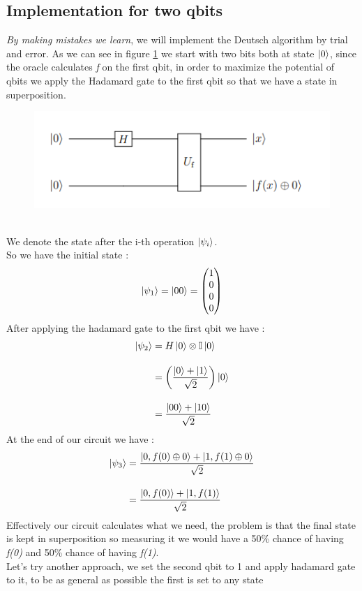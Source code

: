 \subsection{Implementation for two qbits}
\textit{By making mistakes we learn}, we will implement the Deutsch algorithm by trial and error.
As we can see in figure \ref{Deutsh2Bits} we start with two bits both at state $\ket{0}$, since the oracle calculates \textit{f} on the first qbit, in order to maximize the potential of qbits we apply the Hadamard gate to the first qbit so that we have a state in superposition. \\
\begin{figure}[h]
    \centering
    \includegraphics{QuantumAlgorithms/images/Deutsch2Bits.png}
    \caption{}
    \label{Deutsh2Bits}
\end{figure}
\\
We denote the state after the i-th operation $\ket{\psi_i}$. \\
So we have the initial state : 
\begin{align*}
    \ket{\psi_1} = \ket{00} = \begin{pmatrix}1 \\ 0 \\ 0 \\ 0\end{pmatrix}
\end{align*}
After applying the hadamard gate to the first qbit we have :
\begin{align*}
    \ket{\psi_2} &= H\ket{0} \otimes \mathbb{I}\ket{0} \\[10pt]
    &= \qty(\frac{\ket{0} + \ket{1}}{\sqrt{2}})\ket{0} \\[10pt]
    &= \frac{\ket{00} + \ket{10}}{\sqrt{2}}
\end{align*}
At the end of our circuit we have : 
\begin{align*}
    \ket{\psi_3} &= \frac{\ket{0,f(0)\oplus 0} + \ket{1, f(1) \oplus 0}}{\sqrt{2}} \\[10pt]
    &= \frac{\ket{0,f(0)} + \ket{1,f(1)}}{\sqrt{2}}
\end{align*}
\newpage
Effectively our circuit calculates what we need, the problem is that the final state is kept in superposition so measuring it we would have a 50\% chance of having \textit{f(0)} and 50\% chance of having \textit{f(1)}. \\
Let's try another approach, we set the second qbit to 1 and apply hadamard gate to it, to be as general as possible the first is set to any state

